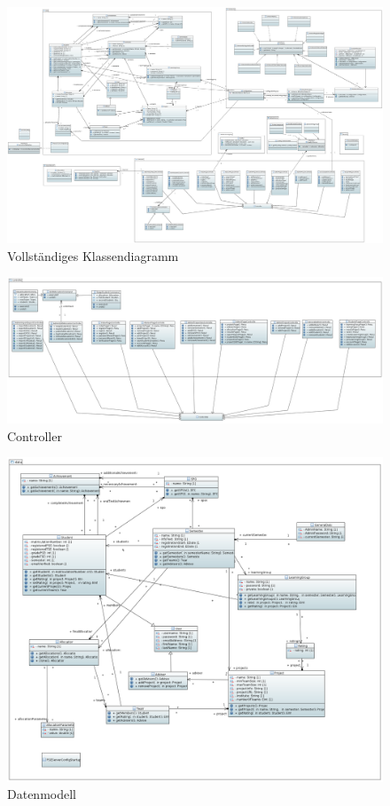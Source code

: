 \documentclass[parskip=full]{scrartcl}
\begin{document}
\begin{figure}
\centering
\includegraphics[width=\linewidth]{bilder/Class_Diagram.PNG}
\caption{Vollständiges Klassendiagramm}
\label{uml:classDiagram}
\end{figure}

\begin{figure}
\centering
\includegraphics[width=\linewidth]{bilder/controller.png}
\caption{Controller}
\label{uml:controller}
\end{figure}

\begin{figure}
\centering
\includegraphics[width=\linewidth]{bilder/daten.png}
\caption{Datenmodell}
\label{uml:data}
\end{figure}
\end{document}
